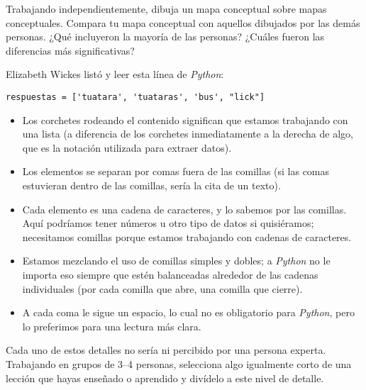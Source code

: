 Trabajando independientemente,
dibuja un mapa conceptual sobre mapas conceptuales.
Compara tu mapa conceptual con aquellos dibujados por las demás personas.
¿Qué incluyeron la mayoría de las personas?
¿Cuáles fueron las diferencias más significativas?


Elizabeth Wickes listó
y leer esta línea de \emph{Python}:

\begin{verbatim}
respuestas = ['tuatara', 'tuataras', 'bus', "lick"]
\end{verbatim}

\begin{itemize}

\item
  Los corchetes rodeando el contenido significan que estamos trabajando con una lista
  (a diferencia de los corchetes inmediatamente a la derecha de algo,
  que es la notación utilizada para extraer datos).

\item
  Los elementos se separan por comas fuera de las comillas
  (si las comas estuvieran dentro de las comillas, sería la cita de un texto).

\item
  Cada elemento es una cadena de caracteres,
  y lo sabemos por las comillas.
  Aquí podríamos tener números u otro tipo de datos si quisiéramos;
  necesitamos comillas porque estamos trabajando con cadenas de caracteres.

\item
  Estamos mezclando el uso de comillas simples y dobles;
  a \emph{Python} no le importa eso siempre que estén balanceadas alrededor 
  de las cadenas individuales (por cada comilla que abre, una comilla que cierre).

\item
  A cada coma le sigue un espacio,
  lo cual no es obligatorio para \emph{Python},
  pero lo preferimos para una lectura más clara.

\end{itemize}

Cada uno de estos detalles no sería ni percibido por una persona experta.
Trabajando en grupos de  3--4 personas,
selecciona algo igualmente corto de una lección que hayas enseñado o aprendido
y divídelo a este nivel de detalle.

